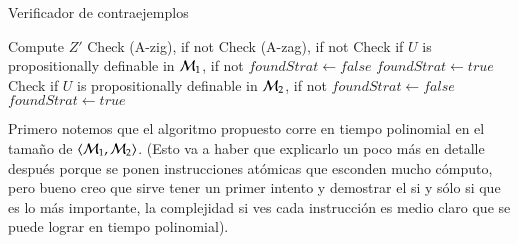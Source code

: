 \begin{demostracion}
    \begin{algorithm}
        \caption{Verificador de contraejemplos}
        \begin{algorithmic}[1]
                \State Compute $Z'$
                \State Check (A-zig), if not 
                \State Check (A-zag), if not 
                \State Check if $U$ is propositionally definable in $\mathcal{M}_1$, if not 
                            \State $foundStrat \gets false$
                                        \State $foundStrat \gets true$
                                    \EndIf         
                                \EndFor
                                \EndIf
                            \EndIf
                        \EndFor
                    \EndFor
                \Else
                    \State Check if $U$ is propositionally definable in $\mathcal{M}_2$, if not 
                            \State $foundStrat \gets false$
                                        \State $foundStrat \gets true$
                                    \EndIf         
                                \EndFor
                                \EndIf
                            \EndIf
                        \EndFor
                    \EndFor
                \EndIf
                \State {}
            \EndFunction
        \end{algorithmic}
    \end{algorithm}

    Primero notemos que el algoritmo propuesto corre en tiempo polinomial en el tamaño de $\langle \mathcal{M}_1,\mathcal{M}_2 \rangle$.
    (Esto va a haber que explicarlo un poco más en detalle después porque se ponen instrucciones atómicas que esconden 
    mucho cómputo, pero bueno creo que sirve tener un primer intento y demostrar el si y sólo si 
    que es lo más importante, la complejidad si ves cada instrucción es medio claro que se puede lograr en tiempo polinomial).


\end{demostracion}
